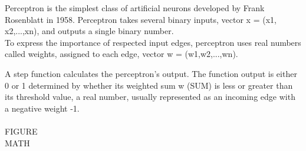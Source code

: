 Perceptron is the simplest class of artificial neurons developed by Frank Rosenblatt in 1958.\cite{perceptronprobabmodel}
Perceptron takes several binary inputs, vector x = (x1, x2,...,xn), and outputs a single binary number. \\
To express the importance of respected input edges, perceptron uses real numbers called weights,
 assigned to each edge, vector w = (w1,w2,...,wn).

A step function calculates the perceptron's output.
The function output is either 0 or 1 determined by whether its weighted sum w (SUM) is less or greater than its threshold value,
 a real number, usually represented as an incoming edge with a negative weight -1. \\
 \\
 FIGURE \\
 MATH \\
